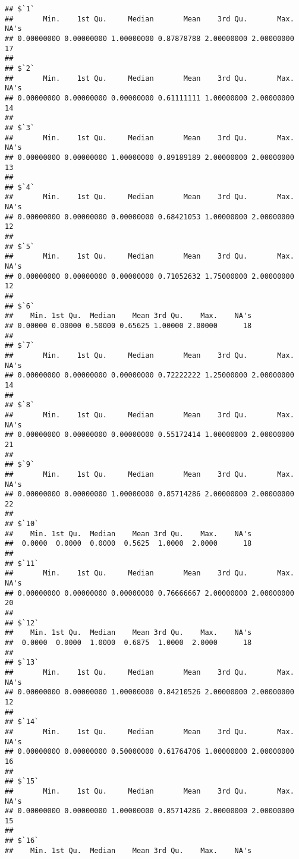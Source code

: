 \documentclass[
]{article}
\begin{document}
\begin{verbatim}
## $`1`
##       Min.    1st Qu.     Median       Mean    3rd Qu.       Max.       NA's 
## 0.00000000 0.00000000 1.00000000 0.87878788 2.00000000 2.00000000         17 
## 
## $`2`
##       Min.    1st Qu.     Median       Mean    3rd Qu.       Max.       NA's 
## 0.00000000 0.00000000 0.00000000 0.61111111 1.00000000 2.00000000         14 
## 
## $`3`
##       Min.    1st Qu.     Median       Mean    3rd Qu.       Max.       NA's 
## 0.00000000 0.00000000 1.00000000 0.89189189 2.00000000 2.00000000         13 
## 
## $`4`
##       Min.    1st Qu.     Median       Mean    3rd Qu.       Max.       NA's 
## 0.00000000 0.00000000 0.00000000 0.68421053 1.00000000 2.00000000         12 
## 
## $`5`
##       Min.    1st Qu.     Median       Mean    3rd Qu.       Max.       NA's 
## 0.00000000 0.00000000 0.00000000 0.71052632 1.75000000 2.00000000         12 
## 
## $`6`
##    Min. 1st Qu.  Median    Mean 3rd Qu.    Max.    NA's 
## 0.00000 0.00000 0.50000 0.65625 1.00000 2.00000      18 
## 
## $`7`
##       Min.    1st Qu.     Median       Mean    3rd Qu.       Max.       NA's 
## 0.00000000 0.00000000 0.00000000 0.72222222 1.25000000 2.00000000         14 
## 
## $`8`
##       Min.    1st Qu.     Median       Mean    3rd Qu.       Max.       NA's 
## 0.00000000 0.00000000 0.00000000 0.55172414 1.00000000 2.00000000         21 
## 
## $`9`
##       Min.    1st Qu.     Median       Mean    3rd Qu.       Max.       NA's 
## 0.00000000 0.00000000 1.00000000 0.85714286 2.00000000 2.00000000         22 
## 
## $`10`
##    Min. 1st Qu.  Median    Mean 3rd Qu.    Max.    NA's 
##  0.0000  0.0000  0.0000  0.5625  1.0000  2.0000      18 
## 
## $`11`
##       Min.    1st Qu.     Median       Mean    3rd Qu.       Max.       NA's 
## 0.00000000 0.00000000 0.00000000 0.76666667 2.00000000 2.00000000         20 
## 
## $`12`
##    Min. 1st Qu.  Median    Mean 3rd Qu.    Max.    NA's 
##  0.0000  0.0000  1.0000  0.6875  1.0000  2.0000      18 
## 
## $`13`
##       Min.    1st Qu.     Median       Mean    3rd Qu.       Max.       NA's 
## 0.00000000 0.00000000 1.00000000 0.84210526 2.00000000 2.00000000         12 
## 
## $`14`
##       Min.    1st Qu.     Median       Mean    3rd Qu.       Max.       NA's 
## 0.00000000 0.00000000 0.50000000 0.61764706 1.00000000 2.00000000         16 
## 
## $`15`
##       Min.    1st Qu.     Median       Mean    3rd Qu.       Max.       NA's 
## 0.00000000 0.00000000 1.00000000 0.85714286 2.00000000 2.00000000         15 
## 
## $`16`
##    Min. 1st Qu.  Median    Mean 3rd Qu.    Max.    NA's 

\end{verbatim}
\end{document}
